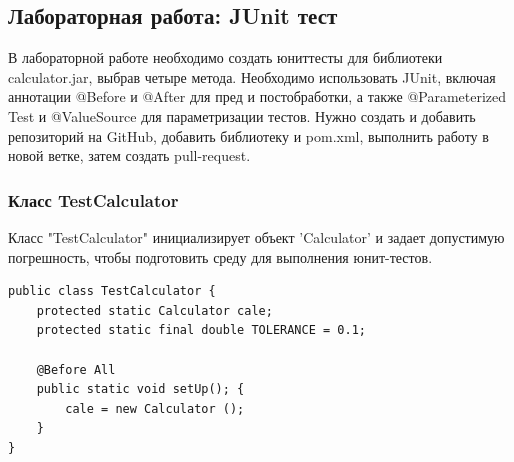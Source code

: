 \documentclass[areasetadvanced]{scrartcl}
\begin{document}
\subsection{Лабораторная работа: JUnit тест}
В лабораторной работе необходимо создать юниттесты для библиотеки calculator.jar, выбрав четыре метода. Необходимо использовать JUnit, включая аннотации @Before и @After для пред и постобработки, а также @Parameterized Test и @ValueSource для параметризации тестов. Нужно создать и добавить репозиторий на GitHub, добавить библиотеку и pom.xml, выполнить работу в новой ветке, затем создать pull-request.
\subsubsection{Класс TestCalculator}
Класс "TestCalculator" инициализирует объект 'Calculator' и задает допустимую погрешность, чтобы подготовить среду для выполнения юнит-тестов.
\begin{lstlisting}[caption={Класс calculator}]
public class TestCalculator {
	protected static Calculator cale;
	protected static final double TOLERANCE = 0.1;

	@Before All
	public static void setUp(); {
		cale = new Calculator ();
	}
}
\end{lstlisting}
\end{document}

